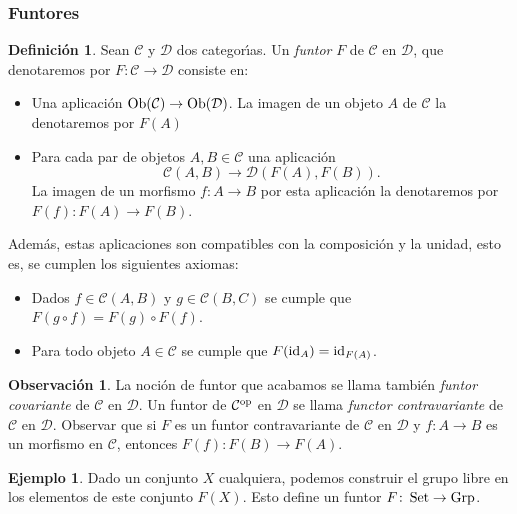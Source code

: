 \documentclass[11pt,a4paper,openright,oneside]{article}
\numberwithin{equation}{section}
\theoremstyle{definition}
\newtheorem{defi}[teo]{Definici\'on}
\newtheorem{ex}[teo]{Ejemplo}
\newtheorem{obs}[teo]{Observaci\'on}
\newcommand{\Set}{\mathop{\rm Set}}
\newcommand{\Grp}{\mathop{\rm Grp}}
\begin{document}
\subsubsection{Funtores}
\begin{defi}
    Sean $\mathcal{C}$ y $\mathcal{D}$ dos categor\'{\i}as. Un \emph{funtor} $F$ de $\mathcal{C}$ en $\mathcal{D}$, que denotaremos por $F\colon\mathcal{C}\to \mathcal{D}$ consiste en:
    \begin{itemize}
        \item Una aplicaci\'on ${\rm Ob}(\mathcal{C})\to {\rm Ob}(\mathcal{D})$. La imagen de un objeto $A$ de $\mathcal{C}$ la denotaremos por $F(A)$
        \item Para cada par de objetos $A,B\in\mathcal{C}$ una aplicaci\'on
              $$
                  \mathcal{C}(A,B)\longrightarrow\mathcal{D}(F(A), F(B)).
              $$
              La imagen de un morfismo $f\colon A\to B$ por esta aplicaci\'on la denotaremos por $F(f)\colon F(A)\to F(B)$.
    \end{itemize}
    Adem\'as, estas aplicaciones son compatibles con la composici\'on y la unidad, esto es, se cumplen los siguientes axiomas:
    \begin{itemize}
        \item Dados $f\in\mathcal{C}(A,B)$ y $g\in\mathcal{C}(B,C)$ se cumple que $F(g\circ f)=F(g)\circ F(f)$.
        \item Para todo objeto $A\in\mathcal{C}$ se cumple que $F({\rm id}_A)={\rm id}_{F(A)}$.
    \end{itemize}
\end{defi}
\begin{obs}
    La noci\'on de funtor que acabamos se llama tambi\'en \emph{funtor covariante} de $\mathcal{C}$ en $\mathcal{D}$. Un funtor de $\mathcal{C}^{\rm op}$ en $\mathcal{D}$ se llama \emph{functor contravariante} de $\mathcal{C}$ en $\mathcal{D}$. Observar que si $F$ es un funtor contravariante de $\mathcal{C}$ en $\mathcal{D}$ y $f\colon A\to B$ es un morfismo en $\mathcal{C}$, entonces $F(f)\colon F(B)\to F(A)$.
\end{obs}
\begin{ex}
    Dado un conjunto $X$ cualquiera, podemos construir el grupo libre en los elementos de este conjunto $F(X)$. Esto define un funtor $F\colon\Set\to\Grp$.
\end{ex}
\end{document}
